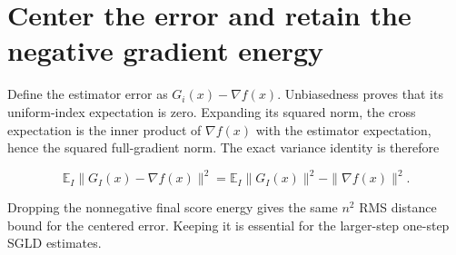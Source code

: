 \documentclass[11pt,a4paper]{article}
\begin{document}
\section{\texorpdfstring{Center the error and retain the negative gradient energy}{Center the error and retain the negative gradient energy}}


Define the estimator error as \(G_i(x)-\nabla f(x)\). Unbiasedness proves that its uniform-index expectation is zero. Expanding its squared norm, the cross expectation is the inner product of \(\nabla f(x)\) with the estimator expectation, hence the squared full-gradient norm. The exact variance identity is therefore

\[\mathbb E_I\|G_I(x)-\nabla f(x)\|^2=\mathbb E_I\|G_I(x)\|^2-\|\nabla f(x)\|^2.\]

Dropping the nonnegative final score energy gives the same \(n^2\) RMS distance bound for the centered error. Keeping it is essential for the larger-step one-step SGLD estimates.
\end{document}
